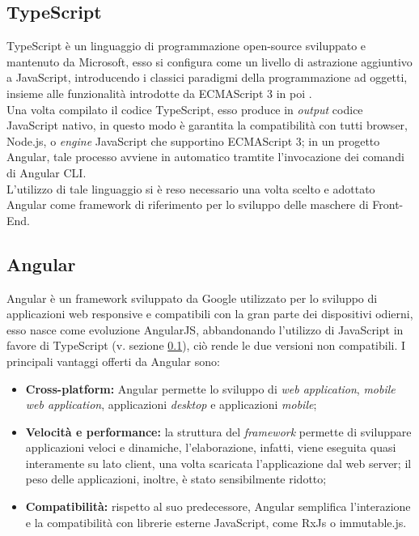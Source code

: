 \subsection{TypeScript}\label{typescript}
\gls{TypeScript} è un linguaggio di programmazione open-source sviluppato e mantenuto da Microsoft, esso si configura come un livello di astrazione aggiuntivo a \gls{JavaScript}, introducendo i classici paradigmi della programmazione ad oggetti, insieme alle funzionalità introdotte da ECMAScript 3 in poi .\\
Una volta compilato il codice TypeScript, esso produce in \textit{output} codice JavaScript nativo, in questo modo è garantita la compatibilità con tutti browser, \gls{Node.js}, o \textit{engine} JavaScript che supportino ECMAScript 3; in un progetto Angular, tale processo avviene in automatico tramtite l'invocazione dei comandi di \gls{Angular CLI}.\\
L'utilizzo di tale linguaggio si è reso necessario una volta scelto e adottato Angular come framework di riferimento per lo sviluppo delle maschere di Front-End.\\

\subsection{Angular}
Angular è un framework sviluppato da Google utilizzato per lo sviluppo di applicazioni web responsive e compatibili con la gran parte dei dispositivi odierni, esso nasce come evoluzione AngularJS, abbandonando l'utilizzo di JavaScript in favore di TypeScript (v. sezione \ref{typescript}), ciò rende le due versioni non compatibili.
I principali vantaggi offerti da Angular sono:
\begin{itemize}
	\item \textbf{Cross-platform:} Angular permette lo sviluppo di \textit{web application}, \textit{mobile web application}, applicazioni \textit{desktop} e applicazioni \textit{mobile};
	\item \textbf{Velocità e performance:} la struttura del \textit{framework} permette di sviluppare applicazioni veloci e dinamiche, l'elaborazione, infatti, viene eseguita quasi interamente su lato client, una volta scaricata l'applicazione dal \gls{web server}; il peso delle applicazioni, inoltre, è stato sensibilmente ridotto;
	\item \textbf{Compatibilità:} rispetto al suo predecessore, Angular semplifica l'interazione e la compatibilità con librerie esterne JavaScript, come \gls{RxJs} o \gls{immutable.js}.
\end{itemize}

